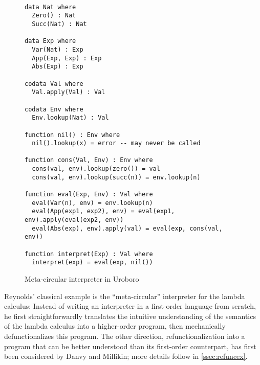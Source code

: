 \begin{figure}
\begin{lstlisting}

data Nat where
  Zero() : Nat
  Succ(Nat) : Nat

data Exp where
  Var(Nat) : Exp
  App(Exp, Exp) : Exp
  Abs(Exp) : Exp

codata Val where
  Val.apply(Val) : Val

codata Env where
  Env.lookup(Nat) : Val

function nil() : Env where
  nil().lookup(x) = error -- may never be called

function cons(Val, Env) : Env where
  cons(val, env).lookup(zero()) = val
  cons(val, env).lookup(succ(n)) = env.lookup(n)

function eval(Exp, Env) : Val where
  eval(Var(n), env) = env.lookup(n)
  eval(App(exp1, exp2), env) = eval(exp1, env).apply(eval(exp2, env))
  eval(Abs(exp), env).apply(val) = eval(exp, cons(val, env))

function interpret(Exp) : Val where
  interpret(exp) = eval(exp, nil())

\end{lstlisting}
\caption{Meta-circular interpreter in Uroboro}
\label{fig:mci}
\end{figure}

Reynolds' classical example is the ``meta-circular'' interpreter for the lambda calculus: Instead of writing an interpreter in a first-order language from scratch, he first straightforwardly translates the intuitive understanding of the semantics of the lambda calculus into a higher-order program, then mechanically defunctionalizes this program. The other direction, refunctionalization into a program that can be better understood than its first-order counterpart, has first been considered by Danvy and Millikin\cite{danvy09refunctionalization}; more details follow in \autoref{ssec:refuncex}.

